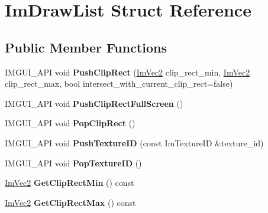 \hypertarget{struct_im_draw_list}{}\section{Im\+Draw\+List Struct Reference}
\label{struct_im_draw_list}
\subsection*{Public Member Functions}
\begin{DoxyCompactItemize}
\item 
\mbox{\label{struct_im_draw_list_acb34e2d3708616cae4567f3b4af06962}} 
I\+M\+G\+U\+I\+\_\+\+A\+PI void {\bfseries Push\+Clip\+Rect} (\hyperlink{struct_im_vec2}{Im\+Vec2} clip\+\_\+rect\+\_\+min, \hyperlink{struct_im_vec2}{Im\+Vec2} clip\+\_\+rect\+\_\+max, bool intersect\+\_\+with\+\_\+current\+\_\+clip\+\_\+rect=false)
\item 
\mbox{\label{struct_im_draw_list_a0ab1ab409f0e269755e50a77901bae39}} 
I\+M\+G\+U\+I\+\_\+\+A\+PI void {\bfseries Push\+Clip\+Rect\+Full\+Screen} ()
\item 
\mbox{\label{struct_im_draw_list_a44f40c59ca755f559020f5a7fa81103a}} 
I\+M\+G\+U\+I\+\_\+\+A\+PI void {\bfseries Pop\+Clip\+Rect} ()
\item 
\mbox{\label{struct_im_draw_list_ac0dc0ecf692ab4c6ce58dd5381efb20d}} 
I\+M\+G\+U\+I\+\_\+\+A\+PI void {\bfseries Push\+Texture\+ID} (const Im\+Texture\+ID \&texture\+\_\+id)
\item 
\mbox{\label{struct_im_draw_list_ade9286c5ca58753f7bd571b30e2ff76c}} 
I\+M\+G\+U\+I\+\_\+\+A\+PI void {\bfseries Pop\+Texture\+ID} ()
\item 
\mbox{\label{struct_im_draw_list_a9d83896d3eb434a9e1072d56523a2754}} 
\hyperlink{struct_im_vec2}{Im\+Vec2} {\bfseries Get\+Clip\+Rect\+Min} () const
\item 
\mbox{\label{struct_im_draw_list_a8e484a61eab501c1c1c416a8b45bb08e}} 
\hyperlink{struct_im_vec2}{Im\+Vec2} {\bfseries Get\+Clip\+Rect\+Max} () const
\item 

\end{DoxyCompactItemize}
